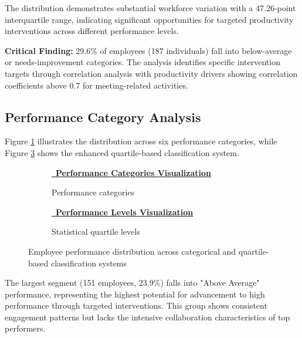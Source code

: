 \documentclass[12pt,a4paper]{article}
\newcommand{\styledimagelink}[2]{\textcolor{accentBlue}{\href{#1}{{\normalsize\faImage}\, \textbf{#2}}}}
\begin{document}
The distribution demonstrates substantial workforce variation with a 47.26-point interquartile range, indicating significant opportunities for targeted productivity interventions across different performance levels.

\begin{warningbox}
\textbf{Critical Finding:} 29.6\% of employees (187 individuals) fall into below-average or needs-improvement categories. The analysis identifies specific intervention targets through correlation analysis with productivity drivers showing correlation coefficients above 0.7 for meeting-related activities.
\end{warningbox}

\subsection{Performance Category Analysis}

Figure \ref{fig:performance_categories} illustrates the distribution across six performance categories, while Figure \ref{fig:performance_levels} shows the enhanced quartile-based classification system.

\begin{figure}[H]
\centering
\begin{subfigure}{0.48\textwidth}
    \styledimagelink{https://fixysaskihumorizijuv.supabase.co/storage/v1/object/public/research-files/1e494264-e593-4726-a6d5-af8b99ddac65-productivity_categories.png?download=}{Performance Categories Visualization}
    \caption{Performance categories}
    \label{fig:performance_categories}
\end{subfigure}
\hfill
\begin{subfigure}{0.48\textwidth}
    \styledimagelink{https://fixysaskihumorizijuv.supabase.co/storage/v1/object/public/research-files/e49b81d0-2cf0-43d7-8965-eb9b40a12b37-performance_levels.png?download=}{Performance Levels Visualization}
    \caption{Statistical quartile levels}
    \label{fig:performance_levels}
\end{subfigure}
\caption{Employee performance distribution across categorical and quartile-based classification systems}
\end{figure}

The largest segment (151 employees, 23.9\%) falls into "Above Average" performance, representing the highest potential for advancement to high performance through targeted interventions. This group shows consistent engagement patterns but lacks the intensive collaboration characteristics of top performers.
\end{document}
